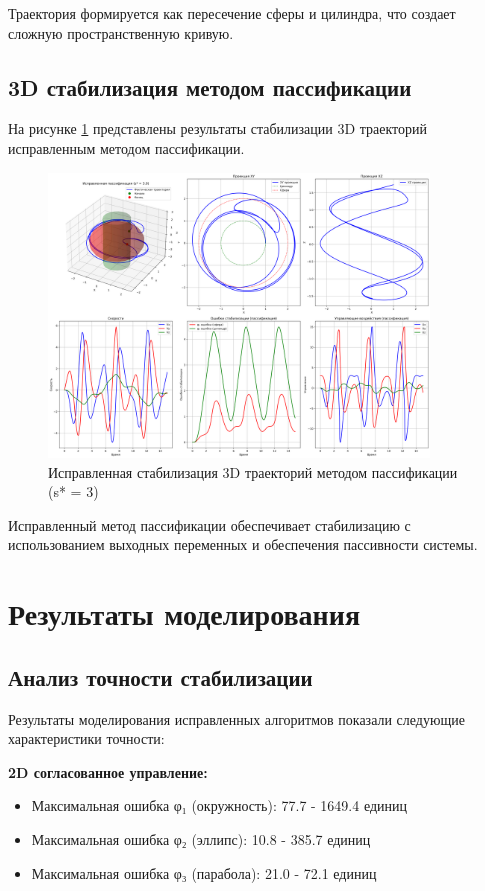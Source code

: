 Траектория формируется как пересечение сферы и цилиндра, что создает сложную пространственную кривую.

\subsection{3D стабилизация методом пассификации}

На рисунке \ref{fig:corrected_passification} представлены результаты стабилизации 3D траекторий исправленным методом пассификации.

\begin{figure}[H]
\centering
\includegraphics[width=0.9\textwidth]{images/task3/corrected_passification_s3.0.png}
\caption{Исправленная стабилизация 3D траекторий методом пассификации (s* = 3)}
\label{fig:corrected_passification}
\end{figure}

Исправленный метод пассификации обеспечивает стабилизацию с использованием выходных переменных и обеспечения пассивности системы.

\section{Результаты моделирования}

\subsection{Анализ точности стабилизации}

Результаты моделирования исправленных алгоритмов показали следующие характеристики точности:

\textbf{2D согласованное управление:}
\begin{itemize}
\item Максимальная ошибка φ₁ (окружность): 77.7 - 1649.4 единиц
\item Максимальная ошибка φ₂ (эллипс): 10.8 - 385.7 единиц
\item Максимальная ошибка φ₃ (парабола): 21.0 - 72.1 единиц
\end{itemize}


